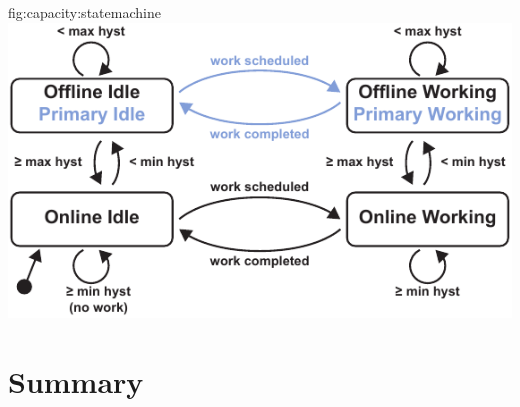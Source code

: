 \begin{definefigure}{fig:capacity:statemachine}
    \centering
    \includegraphics[width=\columnwidth]{figs/capacity/model_state_machine}
    \caption{\normalfont Model state machine.
    A modeled device can be in one of four states: \textsf{Offline Idle},
    \textsf{Online Idle}, \textsf{Online Working}, and \textsf{Offline
    Working}. When a device is \textsf{Offline Idle}, it has run out of energy
    and is off. If a device is \textsf{Online
    Idle}, it is on and in deep sleep, ready to perform work if triggered. If
    triggered, a device moves to \textsf{Online Working}, where it performs a
    portion of a work event.  If a workload is atomic, workload events
    \textit{must} be completed in one \textsf{Online Working} step, without any
    transitions to an offline state.  \textsf{Offline Working} means that while
    working on a non-atomic task, the device ran out of energy, checkpointed,
    and is waiting to harvest more and resume its task.  For devices
    configured with a primary-cell, \textsf{Offline Idle} and \textsf{Offline
    Working} become \textsf{\textcolor{primary-blue}{Primary Idle}} and
    \textsf{\textcolor{primary-blue}{Primary Working}} respectively.  In these
    states, outgoing energy is charged against the primary-cell and the device
    remains online and able to perform work for the life of the primary-cell.
    }
\end{definefigure}

\section{Summary}
